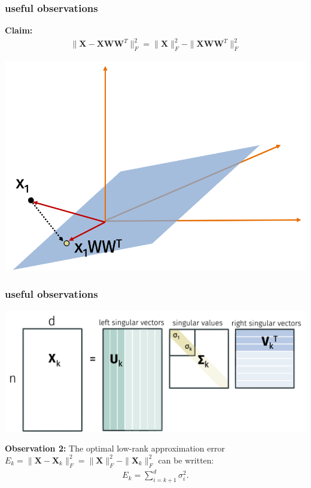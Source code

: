 \documentclass[compress]{beamer}
\newcommand{\bv}[1]{\mathbf{#1}}
\begin{document}
\begin{frame}[t]
	\frametitle{useful observations}
	\textbf{Claim:}
	 \begin{align*}
		\|\bv{X} - \bv{X}\bv{W}\bv{W}^T\|_F^2 =  \|\bv{X}\|_F^2 - \|\bv{X}\bv{W}\bv{W}^T\|_F^2
	\end{align*} 
	\begin{center}
	\includegraphics[width=.7\textwidth]{pythagorean.png}
\end{center} 
	
\end{frame}

\begin{frame}[t]
	\frametitle{useful observations}
	\begin{center}
		\includegraphics[width=.6\textwidth]{svdk.png}
	\end{center} 
	\textbf{Observation 2:}
	The optimal low-rank approximation error $E_k = \|\bv{X} - \bv{X}_k\|_F^2 = \|\bv{X}\|_F^2 - \|\bv{X}_k\|_F^2$ can be written:
	\begin{align*}
		E_k = \sum_{i=k+1}^d \sigma_i^2.
	\end{align*}
\end{frame}
\end{document}
